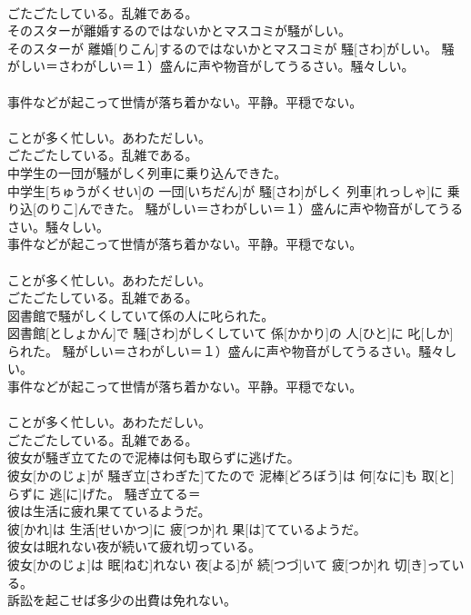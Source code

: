 \documentclass[8pt]{extreport}
\begin{document}
\begin{CJK}{UTF8}{min}
{\\	ごたごたしている。乱雑である。
\\	そのスターが離婚するのではないかとマスコミが騒がしい。	
\\	そのスターが 離婚[りこん]するのではないかとマスコミが 騒[さわ]がしい。	騒がしい＝さわがしい＝１）盛んに声や物音がしてうるさい。騒々しい。 　　　　　　　　　　　
\\	事件などが起こって世情が落ち着かない。平静。平穏でない。 　　　　　　　　　　　
\\	ことが多く忙しい。あわただしい。 　　　　　　　　　　　
\\	ごたごたしている。乱雑である。
\\	中学生の一団が騒がしく列車に乗り込んできた。	
\\	中学生[ちゅうがくせい]の 一団[いちだん]が 騒[さわ]がしく 列車[れっしゃ]に 乗り込[のりこ]んできた。	騒がしい＝さわがしい＝１）盛んに声や物音がしてうるさい。騒々しい。 　　　　　　　　　　　
\\	事件などが起こって世情が落ち着かない。平静。平穏でない。 　　　　　　　　　　　
\\	ことが多く忙しい。あわただしい。 　　　　　　　　　　　
\\	ごたごたしている。乱雑である。
\\	図書館で騒がしくしていて係の人に叱られた。	
\\	図書館[としょかん]で 騒[さわ]がしくしていて 係[かかり]の 人[ひと]に 叱[しか]られた。	騒がしい＝さわがしい＝１）盛んに声や物音がしてうるさい。騒々しい。 　　　　　　　　　　　
\\	事件などが起こって世情が落ち着かない。平静。平穏でない。 　　　　　　　　　　　
\\	ことが多く忙しい。あわただしい。 　　　　　　　　　　　
\\	ごたごたしている。乱雑である。
\\	彼女が騒ぎ立てたので泥棒は何も取らずに逃げた。	
\\	彼女[かのじょ]が 騒ぎ立[さわぎた]てたので 泥棒[どろぼう]は 何[なに]も 取[と]らずに 逃[に]げた。	騒ぎ立てる＝ 
\\	彼は生活に疲れ果てているようだ。	
\\	彼[かれ]は 生活[せいかつ]に 疲[つか]れ 果[は]てているようだ。	
\\	彼女は眠れない夜が続いて疲れ切っている。	
\\	彼女[かのじょ]は 眠[ねむ]れない 夜[よる]が 続[つづ]いて 疲[つか]れ 切[き]っている。	
\\	訴訟を起こせば多少の出費は免れない。	
}
\end{CJK}
\end{document}
